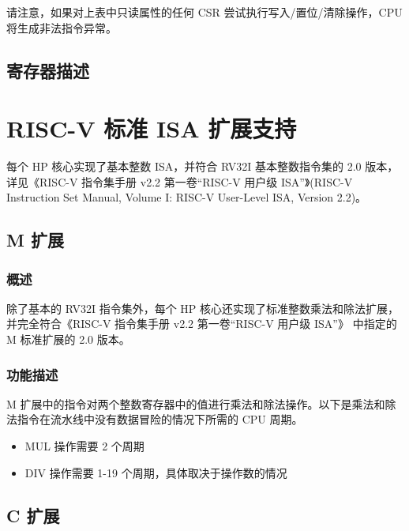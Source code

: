 \documentclass[main\_\_CN.tex]{subfiles}
\begin{document}

请注意，如果对上表中只读属性的任何 CSR 尝试执行写入/置位/清除操作，CPU 将生成非法指令异常。
\subsection{寄存器描述}



\newpage
\section{RISC-V 标准 ISA 扩展支持}

每个 HP 核心实现了基本整数 ISA，并符合 RV32I 基本整数指令集的 2.0 版本，详见《RISC-V 指令集手册 v2.2 第一卷“RISC-V 用户级 ISA”》(RISC-V Instruction Set Manual, Volume I: RISC-V User-Level ISA, Version 2.2)。

\subsection{M 扩展}
\label{sec:riscvcpu-mext}
\subsubsection{概述}
\label{sec:riscvcpu-mext-overview}
除了基本的 RV32I 指令集外，每个 HP 核心还实现了标准整数乘法和除法扩展，并完全符合《RISC-V 指令集手册 v2.2 第一卷“RISC-V 用户级 ISA”》 中指定的 M 标准扩展的 2.0 版本。

\subsubsection{功能描述}
\label{sec:riscvcpu-mext-func-descr}

M 扩展中的指令对两个整数寄存器中的值进行乘法和除法操作。以下是乘法和除法指令在流水线中没有数据冒险的情况下所需的 CPU 周期。

\begin{itemize}
    \item MUL 操作需要 2 个周期
    \item DIV 操作需要 1-19 个周期，具体取决于操作数的情况
\end{itemize}


\subsection{C 扩展}
\label{sec:riscvcpu-cext}
\end{document}
